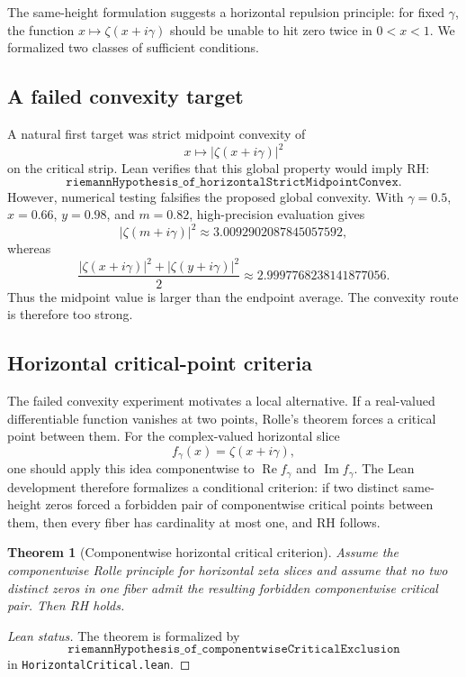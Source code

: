 \documentclass[11pt]{amsart}
\newtheorem{theorem}{Theorem}[section]
\newcommand{\zetaR}{\zeta}
\newcommand{\re}{\operatorname{Re}}
\newcommand{\im}{\operatorname{Im}}
\newcommand{\lean}[1]{\texttt{#1}}
\begin{document}
The same-height formulation suggests a horizontal repulsion principle: for
fixed \(\gamma\), the function \(x\mapsto \zetaR(x+i\gamma)\) should be unable
to hit zero twice in \(0<x<1\).  We formalized two classes of sufficient
conditions.

\subsection{A failed convexity target}

A natural first target was strict midpoint convexity of
\[
  x\mapsto |\zetaR(x+i\gamma)|^2
\]
on the critical strip.  Lean verifies that this global property would imply RH:
\[
  \lean{riemannHypothesis\_of\_horizontalStrictMidpointConvex}.
\]
However, numerical testing falsifies the proposed global convexity.  With
\(\gamma=0.5\), \(x=0.66\), \(y=0.98\), and \(m=0.82\), high-precision
evaluation gives
\[
  |\zetaR(m+i\gamma)|^2 \approx 3.0092902087845057592,
\]
whereas
\[
  \frac{|\zetaR(x+i\gamma)|^2+|\zetaR(y+i\gamma)|^2}{2}
    \approx 2.9997768238141877056.
\]
Thus the midpoint value is larger than the endpoint average.  The convexity
route is therefore too strong.

\subsection{Horizontal critical-point criteria}

The failed convexity experiment motivates a local alternative.  If a
real-valued differentiable function vanishes at two points, Rolle's theorem
forces a critical point between them.  For the complex-valued horizontal slice
\[
  f_\gamma(x)=\zetaR(x+i\gamma),
\]
one should apply this idea componentwise to \(\re f_\gamma\) and \(\im
f_\gamma\).  The Lean development therefore formalizes a conditional criterion:
if two distinct same-height zeros forced a forbidden pair of componentwise
critical points between them, then every fiber has cardinality at most one, and
RH follows.

\begin{theorem}[Componentwise horizontal critical criterion]
Assume the componentwise Rolle principle for horizontal zeta slices and assume
that no two distinct zeros in one fiber admit the resulting forbidden
componentwise critical pair.  Then RH holds.
\end{theorem}

\begin{proof}[Lean status]
The theorem is formalized by
\[
  \lean{riemannHypothesis\_of\_componentwiseCriticalExclusion}
\]
in \lean{HorizontalCritical.lean}.
\end{proof}
\end{document}
